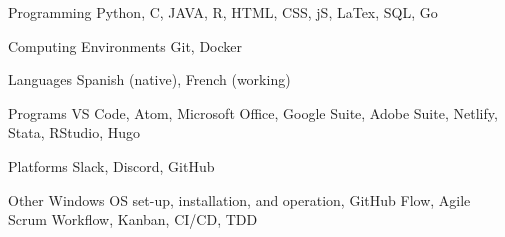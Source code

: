 

\begin{cvskills}


\cvskill
{Programming} %
{Python, C, JAVA, R, HTML, CSS, jS, LaTex, SQL, Go} %


\cvskill
{Computing Environments} %
{Git, Docker} %


\cvskill
{Languages} %
{Spanish (native), French (working)} %


\cvskill
{Programs} %
{VS Code, Atom, Microsoft Office, Google Suite, Adobe Suite, Netlify, Stata, RStudio, Hugo} %


\cvskill
{Platforms} %
{Slack, Discord, GitHub} %


\cvskill
{Other} %
{Windows OS set-up, installation, and operation, GitHub Flow, Agile Scrum Workflow, Kanban, CI/CD, TDD} %


\end{cvskills}